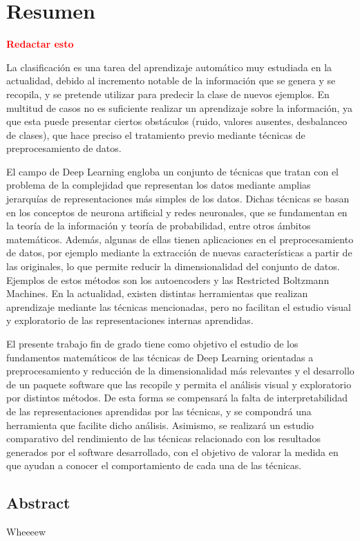 
\chapter*{Resumen}
\textcolor{red}{\textbf{Redactar esto}}

La clasificación es una tarea del aprendizaje automático muy estudiada en la actualidad, debido al
incremento notable de la información que se genera y se recopila, y se pretende utilizar para
predecir la clase de nuevos ejemplos. En multitud de casos no es suficiente realizar un
aprendizaje sobre la información, ya que esta puede presentar ciertos obstáculos (ruido, valores
ausentes, desbalanceo de clases), que hace preciso el tratamiento previo mediante técnicas de
preprocesamiento de datos.

El campo de Deep Learning engloba un conjunto de técnicas que tratan con el problema de la
complejidad que representan los datos mediante amplias jerarquías de representaciones más simples
de los datos. Dichas técnicas se basan en los conceptos de neurona artificial y redes neuronales,
que se fundamentan en la teoría de la información y teoría de probabilidad, entre otros ámbitos
matemáticos. Además, algunas de ellas tienen aplicaciones en el preprocesamiento de datos, por
ejemplo mediante la extracción de nuevas características a partir de las originales, lo que permite
reducir la dimensionalidad del conjunto de datos. Ejemplos de estos métodos son los autoencoders
y las Restricted Boltzmann Machines. En la actualidad, existen distintas herramientas que
realizan aprendizaje mediante las técnicas mencionadas, pero no facilitan el estudio visual y
exploratorio de las representaciones internas aprendidas.

El presente trabajo fin de grado tiene como objetivo el estudio de los fundamentos matemáticos de
las técnicas de Deep Learning orientadas a preprocesamiento y reducción de la dimensionalidad
más relevantes y el desarrollo de un paquete software que las recopile y permita el análisis visual y
exploratorio por distintos métodos. De esta forma se compensará la falta de interpretabilidad de las
representaciones aprendidas por las técnicas, y se compondrá una herramienta que facilite dicho
análisis. Asimismo, se realizará un estudio comparativo del rendimiento de las técnicas relacionado
con los resultados generados por el software desarrollado, con el objetivo de valorar la medida en
que ayudan a conocer el comportamiento de cada una de las técnicas.

\begin{otherlanguage}{american}
\chapter*{Abstract}
Wheeeew
\end{otherlanguage}